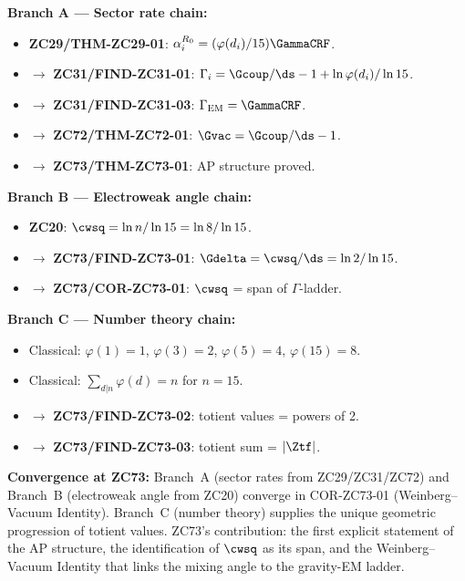 \documentclass[12pt, a4paper]{article}
\begin{document}
\begin{genealogybox}[title={How ZC73's Key Objects Trace Back}]

\textbf{Branch A --- Sector rate chain:}
\begin{itemize}[leftmargin=2em, noitemsep]
  \item \textbf{ZC29/THM-ZC29-01}: $\alpha_i^{R_0} = (\varphi(d_i)/15)\GammaCRF$.
  \item $\to$ \textbf{ZC31/FIND-ZC31-01}: $\Gamma_i = \Gcoup/\ds - 1 + \ln\varphi(d_i)/\ln15$.
  \item $\to$ \textbf{ZC31/FIND-ZC31-03}: $\Gamma_{\rm EM} = \GammaCRF$.
  \item $\to$ \textbf{ZC72/THM-ZC72-01}: $\Gvac = \Gcoup/\ds - 1$.
  \item $\to$ \textbf{ZC73/THM-ZC73-01}: AP structure proved.
\end{itemize}

\textbf{Branch B --- Electroweak angle chain:}
\begin{itemize}[leftmargin=2em, noitemsep]
  \item \textbf{ZC20}: $\cwsq = \ln n/\ln15 = \ln8/\ln15$.
  \item $\to$ \textbf{ZC73/FIND-ZC73-01}: $\Gdelta = \cwsq/\ds = \ln2/\ln15$.
  \item $\to$ \textbf{ZC73/COR-ZC73-01}: $\cwsq$ = span of $\Gamma$-ladder.
\end{itemize}

\textbf{Branch C --- Number theory chain:}
\begin{itemize}[leftmargin=2em, noitemsep]
  \item Classical: $\varphi(1)=1$, $\varphi(3)=2$, $\varphi(5)=4$, $\varphi(15)=8$.
  \item Classical: $\sum_{d|n}\varphi(d) = n$ for $n=15$.
  \item $\to$ \textbf{ZC73/FIND-ZC73-02}: totient values = powers of 2.
  \item $\to$ \textbf{ZC73/FIND-ZC73-03}: totient sum = $|\Ztf|$.
\end{itemize}

\textbf{Convergence at ZC73:}
Branch~A (sector rates from ZC29/ZC31/ZC72) and Branch~B
(electroweak angle from ZC20) converge in COR-ZC73-01
(Weinberg--Vacuum Identity).
Branch~C (number theory) supplies the unique geometric
progression of totient values.
ZC73's contribution: the first explicit statement of the
AP structure, the identification of $\cwsq$ as its span,
and the Weinberg--Vacuum Identity that links the mixing
angle to the gravity-EM ladder.
\end{genealogybox}
\end{document}
